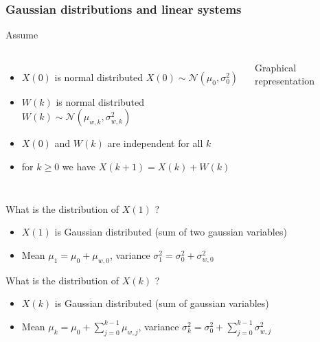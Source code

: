 \begin{frame}
	\frametitle{Gaussian distributions and linear systems}
	Assume 
	\begin{columns}
		\begin{itemize}
			\item $X(0)$ is normal distributed $X(0)\sim\mathcal{N}(\mu_0, \sigma_0^2)$
			\item $W(k)$ is normal distributed $W(k)\sim\mathcal{N}(\mu_{w,k}, \sigma_{w,k}^2)$
			\item $X(0)$ and $W(k)$ are independent for all $k$
			\item for $k\geq0$ we have $X(k+1) =X(k) + W(k)$
		\end{itemize}	
		\begin{block}{Graphical representation}
		\end{block}
	\end{columns}
	
	\vspace*{0.5em}

	 What is the distribution of $X(1)$ ?
	\begin{itemize}
		\item $X(1)$ is Gaussian distributed (sum of two gaussian variables)
		\item Mean $\mu_1=\mu_0+\mu_{w,0}$, variance $\sigma_1^2 = \sigma_0^2 + \sigma_{w,0}^2$
	\end{itemize}

	\vspace*{0.5em}
	 What is the distribution of $X(k)$ ?
	\begin{itemize}
		\item $X(k)$ is Gaussian distributed (sum of gaussian variables)
		\item Mean $\mu_k=\mu_0+\sum_{j=0}^{k-1}\mu_{w,j}$, variance $\sigma_k^2=\sigma_0^2 + \sum_{j=0}^{k-1}\sigma_{w,j}^2$
	\end{itemize}
\end{frame}

